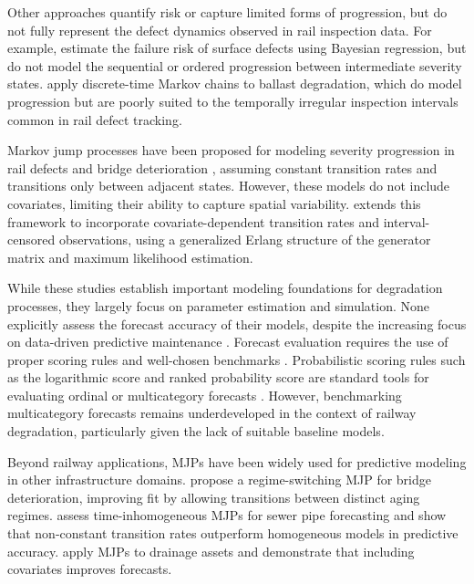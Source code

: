 \documentclass{article}
\begin{document}
Other approaches quantify risk or capture limited forms of progression, but do not fully represent the defect dynamics observed in rail inspection data. For example, \citet{jamshidi2016a} estimate the failure risk of surface defects using Bayesian regression, but do not model the sequential or ordered progression between intermediate severity states. \citet{bressi2021a} apply discrete-time Markov chains to ballast degradation, which do model progression but are poorly suited to the temporally irregular inspection intervals common in rail defect tracking.

Markov jump processes have been proposed for modeling severity progression in rail defects \citep{podofillini2006a} and bridge deterioration \citep{sun2024a}, assuming constant transition rates and transitions only between adjacent states. However, these models do not include covariates, limiting their ability to capture spatial variability. \citet{bisgaard2024A} extends this framework to incorporate covariate-dependent transition rates and interval-censored observations, using a generalized Erlang structure of the generator matrix and maximum likelihood estimation.

While these studies establish important modeling foundations for degradation processes, they largely focus on parameter estimation and simulation. None explicitly assess the forecast accuracy of their models, despite the increasing focus on data-driven predictive maintenance \citep{Binder2023}. Forecast evaluation requires the use of proper scoring rules \citep{Gneiting2007} and well-chosen benchmarks \citep{Hyndman2014}. Probabilistic scoring rules such as the logarithmic score and ranked probability score are standard tools for evaluating ordinal or multicategory forecasts \citep{Epstein1969,friedman1983a}. However, benchmarking multicategory forecasts remains underdeveloped in the context of railway degradation, particularly given the lack of suitable baseline models.

Beyond railway applications, MJPs have been widely used for predictive modeling in other infrastructure domains. \citet{Mizutani2023RegimeSwitching} propose a regime-switching MJP for bridge deterioration, improving fit by allowing transitions between distinct aging regimes. \citet{JimenezRoa2024Nonhomogeneous} assess time-inhomogeneous MJPs for sewer pipe forecasting and show that non-constant transition rates outperform homogeneous models in predictive accuracy. \citet{Wu2021ConditionPrediction} apply MJPs to drainage assets and demonstrate that including covariates improves forecasts. 
\end{document}
